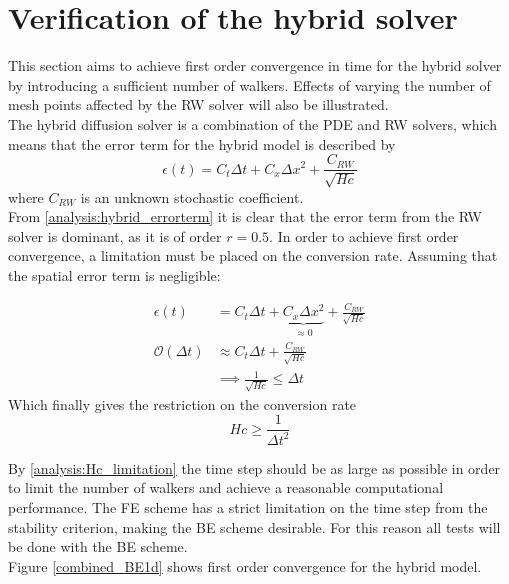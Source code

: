 \section{Verification of the hybrid solver}
\noindent This section aims to achieve first order convergence in time for the hybrid solver by introducing a sufficient number of walkers. 
Effects of varying the number of mesh points affected by the RW solver will also be illustrated. \\

The hybrid diffusion solver is a combination of the PDE and RW solvers, which means that the error term for the hybrid model is described by 
\begin{equation}\label{analysis:hybrid_errorterm}
 \epsilon(t) = C_t \Delta t + C_x \Delta x^2 + \frac{C_{RW}}{\sqrt{Hc}}
\end{equation}
where $C_{RW}$ is an unknown stochastic coefficient.\\

\noindent From \eqref{analysis:hybrid_errorterm} it is clear that the error term from the RW solver is dominant, as it is of order $r=0.5$. 
In order to achieve first order convergence, a limitation must be placed on the conversion rate. 
Assuming that the spatial error term is negligible: 

\begin{align}
 \epsilon(t) &= C_t \Delta t + \underbrace{C_x \Delta x^2}_{\approx 0} + \frac{C_{RW}}{\sqrt{Hc}}\\
 \mathcal O(\Delta t) &\approx C_t \Delta t + \frac{C_{RW}}{\sqrt{Hc}} \\
 &\implies  \frac{1}{\sqrt{Hc}} \leq \Delta t
\end{align}
Which finally gives the restriction on the conversion rate
\begin{equation}\label{analysis:Hc_limitation}
 Hc\geq\frac{1}{\Delta t^2}
\end{equation}

\noindent By \eqref{analysis:Hc_limitation} the time step should be as large as possible in order to limit the number of walkers and achieve a reasonable computational performance. 
The FE scheme has a strict limitation on the time step from the stability criterion, making the BE scheme desirable. 
For this reason all tests will be done with the BE scheme. \\
Figure \ref{combined_BE1d} shows first order convergence for the hybrid model.

